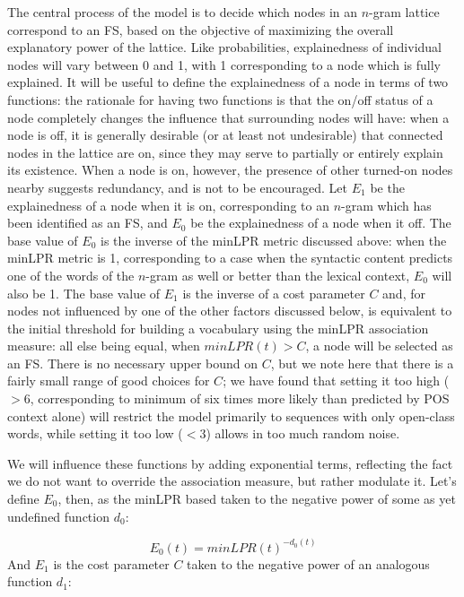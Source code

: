 \documentclass[11pt,letterpaper]{article}
\begin{document}
The central process of the model is to decide which nodes in an $n$-gram lattice correspond to an FS, based on the objective of maximizing the overall explanatory power of the lattice. Like probabilities, explainedness of individual nodes will vary between 0 and 1, with 1 corresponding to a node which is fully explained. It will be useful to define the explainedness of a node in terms of two functions: the rationale for having two functions is that the on/off status of a node completely changes the influence that surrounding nodes will have: when a node is off, it is generally desirable (or at least not undesirable) that connected nodes in the lattice are on, since they may serve to partially or entirely explain its existence. When a node is on, however, the presence of other turned-on nodes nearby suggests redundancy, and is not to be encouraged. Let $E_{1}$ be the explainedness of a node when it is on, corresponding to an $n$-gram which has been identified as an FS, and $E_{0}$ be the explainedness of a node when it off. The base value of $E_{0}$ is the inverse of the minLPR metric discussed above: when the minLPR metric is 1, corresponding to a case when the syntactic content predicts one of the words of the $n$-gram as well or better than the lexical context, $E_{0}$  will also be 1. The base value of $E_{1}$ is the inverse of a cost parameter $C$ and, for nodes not influenced by one of the other factors discussed below, is equivalent to the initial threshold for building a vocabulary using the minLPR association measure: all else being equal, when $minLPR(t) > C$, a node will be selected as an FS. There is no necessary upper bound on $C$, but we note here that there is a fairly small range of good choices for $C$; we have found that setting it too high ($>6$, corresponding to minimum of six times more likely than predicted by POS context alone) will restrict the model primarily to sequences with only open-class words, while setting it too low ($<3$) allows in too much random noise.


We will influence these functions by adding exponential terms, reflecting the fact we do not want to override the association measure, but rather modulate it. Let's define $E_0$, then, as the minLPR based taken to the negative power of some as yet undefined function $d_0$:

\begin{displaymath}
E_0(t) = minLPR(t)^{-d_0(t)}
\end{displaymath}
And $E_1$ is the cost parameter $C$ taken to the negative power of an analogous function $d_1$:
\end{document}
